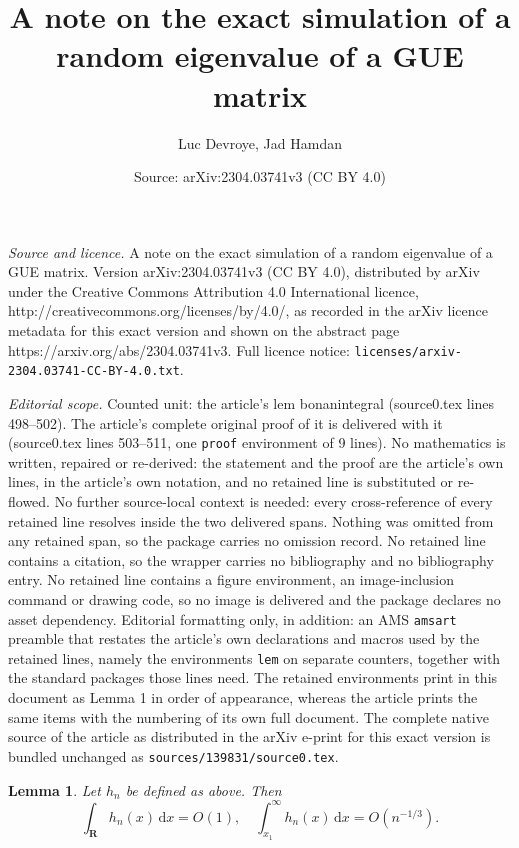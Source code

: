 \documentclass[10pt,a4paper]{amsart}
\title{A note on the exact simulation of a random eigenvalue of a GUE matrix}
\author{Luc Devroye, Jad Hamdan}
\date{Source: arXiv:2304.03741v3 (CC BY 4.0)}
\newtheorem{lem}{Lemma}
\renewcommand{\mathbb}{\mathbf}
\begin{document}
\maketitle

\noindent\emph{Source and licence.} A note on the exact simulation of a random eigenvalue of a GUE matrix. Version arXiv:2304.03741v3 (CC BY 4.0), distributed by arXiv under the Creative Commons Attribution 4.0 International licence, http://creativecommons.org/licenses/by/4.0/, as recorded in the arXiv licence metadata for this exact version and shown on the abstract page https://arxiv.org/abs/2304.03741v3. Full licence notice: \texttt{licenses/arxiv-2304.03741-CC-BY-4.0.txt}.\par\smallskip

\noindent\textit{Editorial scope.} Counted unit: the article's lem bonanintegral (source0.tex lines 498--502). The article's complete original proof of it is delivered with it (source0.tex lines 503--511, one \texttt{proof} environment of 9 lines). No mathematics is written, repaired or re-derived: the statement and the proof are the article's own lines, in the article's own notation, and no retained line is substituted or re-flowed.  No further source-local context is needed: every cross-reference of every retained line resolves inside the two delivered spans.  Nothing was omitted from any retained span, so the package carries no omission record.  No retained line contains a citation, so the wrapper carries no bibliography and no bibliography entry.  No retained line contains a figure environment, an image-inclusion command or drawing code, so no image is delivered and the package declares no asset dependency.  Editorial formatting only, in addition: an AMS \texttt{amsart} preamble that restates the article's own declarations and macros used by the retained lines, namely the environments \texttt{lem} on separate counters, together with the standard packages those lines need.  The retained environments print in this document as Lemma 1 in order of appearance, whereas the article prints the same items with the numbering of its own full document.  The complete native source of the article as distributed in the arXiv e-print for this exact version is bundled unchanged as \texttt{sources/139831/source0.tex}.
\begin{lem}\label{bonanintegral} Let $h_n$ be defined as above. Then
    \[
        \int_\mathbb{R} h_n(x) \,\mathrm{d}x = O(1), \quad \int_{x_1}^{\infty} h_n(x) \, \mathrm{d}x = O(n^{-1/3}).
    \]
\end{lem}
\end{document}
